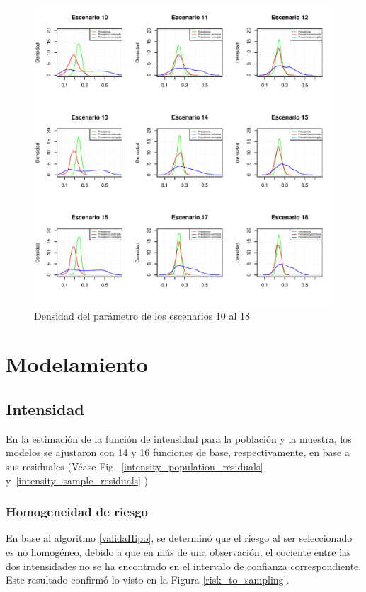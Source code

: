 \begin{figure}[h] 
	\centering
	\includegraphics[width=1\textwidth]{graficos/simu_10-18.pdf}
	\caption{Densidad del parámetro de los escenarios 10 al 18} \label{simu_10-18}
\end{figure}


\newpage

\section{Modelamiento}
\subsection{Intensidad}
\label{seccion_intensidad}
En la estimación de la función de intensidad para la población y la muestra, los modelos se ajustaron con 14 y 16 funciones de base, respectivamente, en base a sus residuales (Véase Fig.~\ref{intensity_population_residuals} y~\ref{intensity_sample_residuals} )

\subsubsection{Homogeneidad de riesgo}

En base al algoritmo \ref{validaHipo}, se determinó que el riesgo al ser seleccionado es no homogéneo, debido a que en más de una observación, el cociente entre las dos intensidades no se ha encontrado en el intervalo de confianza correspondiente. Este resultado confirmó lo visto en la Figura \ref{risk_to_sampling}.

